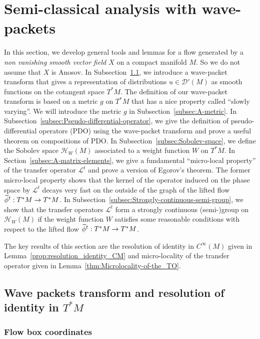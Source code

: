 \documentclass[AHL,Unicode,longabstracts,published]{cedram}
\newcommand{\clH}{\mathcal{H}}
\newcommand{\clL}{\mathcal{L}}
\newcommand{\clD}{\mathcal{D}}
\let\oldtilde\tilde
\renewcommand*{\tilde}[1]{\mathchoice{\widetilde{#1}}{\widetilde{#1}}{\oldtilde{#1}}{\oldtilde{#1}}}
\newcommand{\clH}{\mathcal{H}}
\begin{document}
\section{Semi-classical analysis with wave-packets}\label{sec:Semiclassical-analysis-with}

In this section, we develop general tools and lemmas for a flow generated by a \emph{non vanishing smooth vector field $X$ }on a compact manifold $M$. So we do not assume that $X$ is Anosov. In Subsection~\ref{subsec:Resolution-of-identity}, we introduce a wave-packet transform that gives a representation of distributions $u\in\clD'(M)$ as smooth functions on the cotangent space $T^{*}M$. The definition of our wave-packet transform is based on a metric $g$ on $T^{*}M$ that has a nice property called ``slowly varying''. We will introduce the metric $g$ in Subsection~\ref{subsec:A-metric}. In Subsection~\ref{subsec:Pseudo-differential-operator}, we give the definition of pseudo-differential operators (PDO) using the wave-packet transform and prove a useful theorem on compositions of PDO. In Subsection~\ref{subsec:Sobolev-space}, we define the Sobolev space $\clH _{W}(M)$ associated to a weight function $W$ on $T^{*}M$. In Section~\ref{subsec:A-matrix-elements}, we give a fundamental ``micro-local property'' of the transfer operator $\clL^{t}$ and prove a version of Egorov's theorem. The former micro-local property shows that the kernel of the operator induced on the phase space by $\clL^{t}$ decays very fast on the outside of the graph of the lifted flow $\tilde{\phi}^{t}:T^{*}M\rightarrow T^{*}M$. In Subsection~\ref{subsec:Strongly-continuous-semi-group}, we show that the transfer operators $\clL^{t}$ form a strongly continuous (semi-)group on $\clH _{W}(M)$ if the weight function $W$ satisfies some reasonable conditions with respect to the lifted flow $\tilde{\phi}^{t}:T^{*}M\rightarrow T^{*}M$.

The key results of this section are the resolution of identity in $C^{\infty}(M)$ given in Lemma~\ref{prop:resolution_identity_CM} and micro-locality of the transfer operator given in Lemma~\ref{thm:Microlocality-of-the_TO}.

\subsection{Wave packets transform and resolution of identity in \texorpdfstring{$T^{*}M$}{T*M}}\label{subsec:Resolution-of-identity}

\subsubsection{Flow box coordinates}
\end{document}
